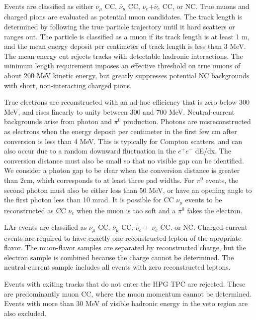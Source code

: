 Events are classified as either $\nu_{\mu}$ CC, $\bar{\nu}_{\mu}$ CC, $\nu_{e}$+$\bar{\nu}_{e}$ CC, or NC. True muons and charged pions are evaluated as potential muon candidates. The track length is determined by following the true particle trajectory until it hard scatters or ranges out. The particle is classified as a muon if its track length is at least 1 m, and the mean energy deposit per centimeter of track length is less than 3 MeV. The mean energy cut rejects tracks with detectable hadronic interactions. The minimum length requirement imposes an effective threshold on true muons of about 200 MeV kinetic energy, but greatly suppresses potential NC backgrounds with short, non-interacting charged pions.

True electrons are reconstructed with an ad-hoc efficiency that is zero below 300 MeV, and rises linearly to unity between 300 and 700 MeV. Neutral-current backgrounds arise from photon and $\pi^{0}$ production. Photons are misreconstructed as electrons when the energy deposit per centimeter in the first few cm after conversion is less than 4 MeV. This is typically for Compton scatters, and can also occur due to a random downward fluctuation in the $e^{+}e^{-}$ dE/dx. The conversion distance must also be small so that no visible gap can be identified. We consider a photon gap to be clear when the conversion distance is greater than 2cm, which corresponds to at least three pad widths. For $\pi^{0}$ events, the second photon must also be either less than 50 MeV, or have an opening angle to the first photon less than 10 mrad. It is possible for CC $\nu_{\mu}$ events to be reconstructed as CC $\nu_{e}$ when the muon is too soft and a $\pi^{0}$ fakes the electron.

LAr events are classified as $\nu_{\mu}$ CC, $\bar{\nu}_{\mu}$ CC, $\nu_{e}$ + $\bar{\nu}_{e}$ CC, or NC. Charged-current events are required to have exactly one reconstructed lepton of the apropriate flavor. The muon-flavor samples are separated by reconstructed charge, but the electron sample is combined because the charge cannot be determined. The neutral-current sample includes all events with zero reconstructed leptons.

Events with exiting tracks that do not enter the HPG TPC are rejected. These are predominantly muon CC, where the muon momentum cannot be determined. Events with more than 30 MeV of visible hadronic energy in the veto region are also excluded.

